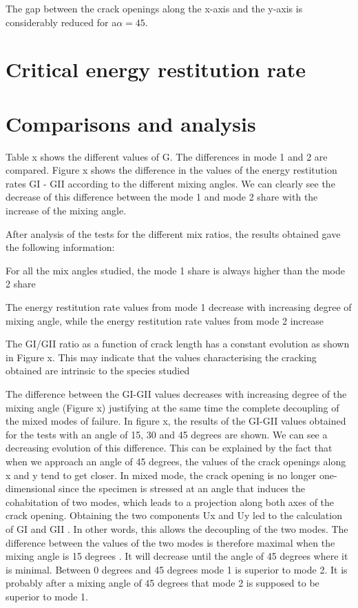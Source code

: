 The gap between the crack openings along the x-axis and the y-axis is considerably reduced for a$\alpha=45$.

\section{Critical energy restitution rate}

\section{Comparisons and analysis}

Table x shows the different values of G. The differences in mode 1 and 2 are compared.
Figure x shows the difference in the values of the energy restitution rates GI - GII according to the different mixing angles. We can clearly see the decrease of this difference between the mode 1 and mode 2 share with the increase of the mixing angle.

After analysis of the tests for the different mix ratios, the results obtained gave the following information:

For all the mix angles studied, the mode 1 share is always higher than the mode 2 share

The energy restitution rate values from mode 1 decrease with increasing degree of mixing angle, while the energy restitution rate values from mode 2 increase

The GI/GII ratio as a function of crack length has a constant evolution as shown in Figure x. This may indicate that the values characterising the cracking obtained are intrinsic to the species studied

The difference between the GI-GII values decreases with increasing degree of the mixing angle (Figure x) justifying at the same time the complete decoupling of the mixed modes of failure. In figure x, the results of the GI-GII values obtained for the tests with an angle of 15, 30 and 45 degrees are shown. We can see a decreasing evolution of this difference. This can be explained by the fact that when we approach an angle of 45 degrees, the values of the crack openings along x and y tend to get closer. In mixed mode, the crack opening is no longer one-dimensional since the specimen is stressed at an angle that induces the cohabitation of two modes, which leads to a projection along both axes of the crack opening. Obtaining the two components Ux and Uy led to the calculation of GI and GII . In other words, this allows the decoupling of the two modes. The difference between the values of the two modes is therefore maximal when the mixing angle is 15 degrees . It will decrease until the angle of 45 degrees where it is minimal. Between 0 degrees and 45 degrees mode 1 is superior to mode 2. It is probably after a mixing angle of 45 degrees that mode 2 is supposed to be superior to mode 1.